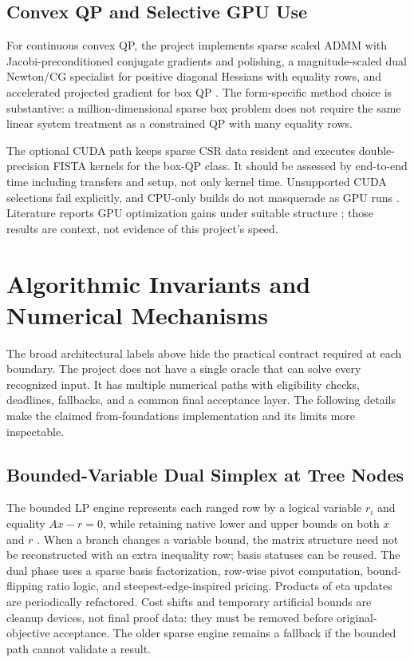 \documentclass[10pt,a4paper,twocolumn]{article}
\begin{document}
\subsection{Convex QP and Selective GPU Use}

For continuous convex QP, the project implements sparse scaled ADMM with Jacobi-preconditioned conjugate gradients and polishing, a magnitude-scaled dual Newton/CG specialist for positive diagonal Hessians with equality rows, and accelerated projected gradient for box QP \cite{arch,qp9002}. The form-specific method choice is substantive: a million-dimensional sparse box problem does not require the same linear system treatment as a constrained QP with many equality rows.

The optional CUDA path keeps sparse CSR data resident and executes double-precision FISTA kernels for the box-QP class. It should be assessed by end-to-end time including transfers and setup, not only kernel time. Unsupported CUDA selections fail explicitly, and CPU-only builds do not masquerade as GPU runs \cite{arch,gpu03}. Literature reports GPU optimization gains under suitable structure \cite{gpuadmm2020,cupdlp2025}; those results are context, not evidence of this project's speed.

\section{Algorithmic Invariants and Numerical Mechanisms}

The broad architectural labels above hide the practical contract required at each boundary. The project does not have a single oracle that can solve every recognized input. It has multiple numerical paths with eligibility checks, deadlines, fallbacks, and a common final acceptance layer. The following details make the claimed from-foundations implementation and its limits more inspectable.

\subsection{Bounded-Variable Dual Simplex at Tree Nodes}

The bounded LP engine represents each ranged row by a logical variable $r_i$ and equality $Ax-r=0$, while retaining native lower and upper bounds on both $x$ and $r$ \cite{bounded}. When a branch changes a variable bound, the matrix structure need not be reconstructed with an extra inequality row; basis statuses can be reused. The dual phase uses a sparse basis factorization, row-wise pivot computation, bound-flipping ratio logic, and steepest-edge-inspired pricing. Products of eta updates are periodically refactored. Cost shifts and temporary artificial bounds are cleanup devices, not final proof data: they must be removed before original-objective acceptance. The older sparse engine remains a fallback if the bounded path cannot validate a result.
\end{document}
